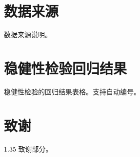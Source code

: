 \documentclass[12pt, UTF8]{ctexart}
\begin{document}
\newpage
{}
\printbibliography[heading=bibliography,title=参考文献]

\newpage
{}

\begin{appendices}

\section{数据来源}
数据来源说明。

\newpage
\section{稳健性检验回归结果}
稳健性检验的回归结果表格。支持自动编号。

\end{appendices}

\newpage
{}
\section*{致谢}

\begin{spacing}{1.35}
致谢部分。
\end{spacing}
\end{document}
